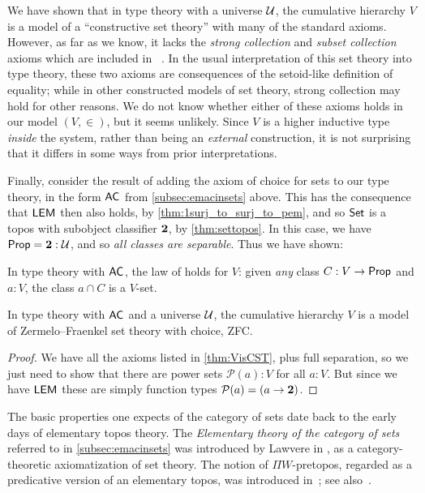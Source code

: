 We have shown that in type theory with a universe $\mathcal{U}$, the cumulative hierarchy $V$ is a model of a ``constructive set theory'' with many of the standard axioms.
However, as far as we know, it lacks the \emph{strong collection} and \emph{subset collection} axioms which are included in \CZF{}~\cite{AczelCZF}.
In the usual interpretation of this set theory into type theory, these two axioms are consequences of the setoid-like definition of equality; while in other constructed models of set theory, strong collection may hold for other reasons.
We do not know whether either of these axioms holds in our model $(V,\in)$, but it seems unlikely.
Since $V$ is a higher inductive type \emph{inside} the system, rather than being an \emph{external} construction, it is not surprising that it differs in some ways from prior interpretations.

Finally, consider the result of adding the axiom of choice for sets to our type theory, in the form  $\mathsf{AC}_{}$ from \autoref{subsec:emacinsets} above.  This has the consequence that $\mathsf{LEM}_{}$ then also holds, by \autoref{thm:1surj_to_surj_to_pem}, and so $\mathsf{Set}$ is a topos with subobject classifier $\mathbf{2}$, by \autoref{thm:settopos}.  In this case, we have $\mathsf{Prop} = \mathbf{2}:\mathcal{U}$, and so \emph{all classes are separable}.  Thus we have shown:

\begin{lem}\label{lem:fullsep}
In type theory with $\mathsf{AC}_{}$, the law of  holds for $V$: given \emph{any} class $C : V \to \mathsf{Prop}$ and $a : V$, the class $a \cap C$ is a $V$-set.
\end{lem}

\begin{thm}\label{thm:zfc}
In type theory with $\mathsf{AC}_{}$ and a universe $\mathcal{U}$, the cumulative hierarchy $V$ is a model of Zermelo--Fraenkel set theory with choice, ZFC.
\end{thm}

\begin{proof}
We have all the axioms listed in \autoref{thm:VisCST}, plus full separation, so we just need to show that there are power sets $\mathcal{P}(a):V$ for all $a:V$.  But since we have $\mathsf{LEM}_{}$ these are simply function types $\mathcal{P}(a) = (a\to\mathbf{2})$.
\end{proof}

\sectionNotes

The basic properties one expects of the category of sets date back to the early days of elementary topos theory.
The \emph{Elementary theory of the category of sets} referred to in \autoref{subsec:emacinsets} was introduced by Lawvere in
\cite{lawvere:etcs-long}, as a category-theoretic axiomatization of set theory.
The notion of $\Pi W$-pretopos, regarded as a predicative version of an elementary topos, was introduced in~\cite{MoerdijkPalmgren2002}; see also~\cite{palmgren:cetcs}.

